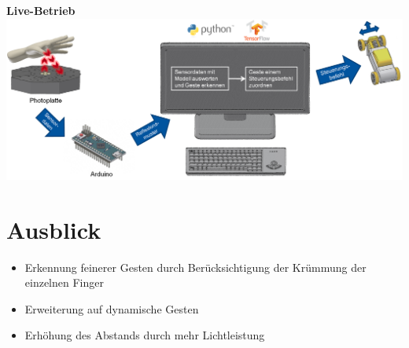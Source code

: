 ﻿\documentclass{sciposter}
\begin{document}
\begin{multicols}{3}
\vfill

\textbf{Live-Betrieb}\\
\vspace{1.0cm}
\includegraphics[scale=0.7]{../figures/LiveBetrieb.png}



\section{Ausblick}
\noindent

\begin{itemize}
	\item Erkennung feinerer Gesten durch Berücksichtigung der Krümmung der einzelnen Finger
	\item Erweiterung auf dynamische Gesten
	\item Erhöhung des Abstands durch mehr Lichtleistung
\end{itemize}


\end{multicols}
\end{document}
